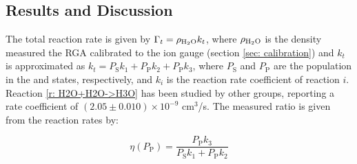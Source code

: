 \subsection{Results and Discussion}

The total reaction rate is given by $\Gamma_t = \rho_{\ce{H2O}} k_t$, where $\rho_{\ce{H2O}}$ is the  density measured the RGA calibrated to the ion gauge (section \ref{sec: calibration}) and $k_t$ is approximated as $k_t = P_\text{S} k_1 + P_\text{P} k_2 + P_\text{P} k_3$, where $P_\text{S}$ and $P_\text{P}$ are the  population in the  and  states, respectively, and $k_i$ is the reaction rate coefficient of reaction $i$. Reaction \cref{r: H2O+H2O->H3O} has been studied by other groups, reporting a rate coefficient of $(2.05 \pm 0.010) \times 10^{-9}$ cm$^3$/s.\cite{Huntress2004} The measured  ratio is given from the reaction rates by:

\begin{equation}
	\eta(P_\text{P}) = \frac{P_\text{P} k_3}{P_\text{S} k_1 + P_\text{P} k_2}
	\label{eq: eta=H3O/BeOH}
\end{equation}

